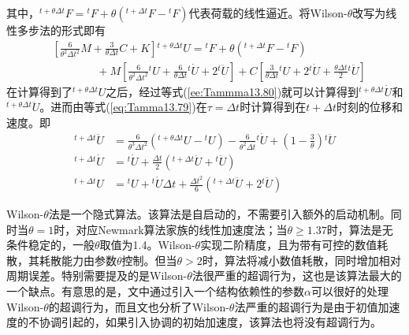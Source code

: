 其中，${^{t+\theta\Delta t}\!F}={^t\!F}+\theta({^{t+\Delta t}\!F}-{^t\!F})$代表荷载的线性逼近。将Wilson-$\theta$改写为线性多步法的形式即有
\begin{equation}
\begin{split}
&\left[\frac{6}{\theta^2\Delta t^2}M+\frac{3}{\theta\Delta t}C+K\right]{^{t+\theta\Delta t}\!U}={^t\!F}+\theta({^{t+\Delta t}\!F}-{^t\!F})\\
&\qquad\qquad+M\left[\frac{6}{\theta^2\Delta t^2}{^t\!U}+\frac{6}{\theta\Delta t}{^t\!\dot{U}}+2{^t\!\ddot{U}}\right]+C\left[\frac{3}{\theta\Delta t}{^t\!U}+2{^t\!\dot{U}}+\frac{\theta\Delta t}{2}{^t\!\ddot{U}}\right]
\end{split}
\end{equation}
在计算得到了${^{t+\theta\Delta t}\!U}$之后，经过等式(\ref{ee:Tammma13.80})就可以计算得到${^{t+\theta\Delta t}\!\dot{U}}$和${^{t+\theta\Delta t}\!\ddot{U}}$。进而由等式(\ref{eq:Tamma13.79})在$\tau=\Delta t$时计算得到在$t+\Delta t$时刻的位移和速度。即
\begin{subequations}
\begin{align}
{^{t+\Delta t}\!\ddot{U}}&=\frac{6}{\theta^3\Delta t^2}({^{t+\theta\Delta t}\!U}-{^t\!U})-\frac{6}{\theta^2\Delta t}{^t\!\dot{U}}+\left(1-\frac{3}{\theta}\right){^t\!\ddot{U}}\\
{^{t+\Delta t}\!\dot{U}}&={^t\!\dot{U}}+\frac{\Delta t}{2}({^{t+\Delta t}\!\ddot{U}}+{^t\!\ddot{U}})\\
{^{t+\Delta t}\!U}&={^t\!U}+{^t\!\dot{U}}\Delta t+\frac{\Delta t^2}{6}({^{t+\Delta t}\!\ddot{U}}+2{^t\!\ddot{U}})
\end{align}
\end{subequations}

Wilson-$\theta$法是一个隐式算法。该算法是自启动的，不需要引入额外的启动机制。同时当$\theta=1$时，对应Newmark算法家族的线性加速度法；当$\theta\ge1.37$时，算法是无条件稳定的，一般$\theta$取值为1.4。Wilson-$\theta$实现二阶精度，且为带有可控的数值耗散，其耗散能力由参数$\theta$控制。但当$\theta>2$时，算法将减小数值耗散，同时增加相对周期误差。特别需要提及的是Wilson-$\theta$法很严重的超调行为\cite{Zhou2004c}，这也是该算法最大的一个缺点。有意思的是，文中通过引入一个结构依赖性的参数$\alpha$可以很好的处理Wilson-$\theta$的超调行为，而且文也分析了Wilson-$\theta$法严重的超调行为是由于初值加速度的不协调引起的，如果引入协调的初始加速度，该算法也将没有超调行为。

